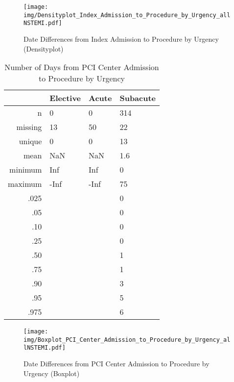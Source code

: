 \documentclass[presentation,xcolor=pdftex,dvipsnames,table,11pt]{beamer}
\begin{document}
\begin{tiny}
\begin{frame}
\begin{figure}
  \centering
  \caption{Date Differences from Index Admission to Procedure by Urgency (Densityplot)}
  \label{Density: Date Differences from Index Admission to Procedure by Urgency}
\texttt{[image: img/Densityplot\_Index\_Admission\_to\_Procedure\_by\_Urgency\_allNSTEMI.pdf]}\end{figure}
\end{frame}





\begin{table}[ht]
\centering
\begin{tabular}{rlll}
  \toprule
 & Elective & Acute & Subacute \\ 
  \midrule
n & 0 & 0 & 314 \\ 
  missing & 13 & 50 & 22 \\ 
  unique & 0 & 0 & 13 \\ 
  mean & NaN & NaN & 1.6 \\ 
  minimum & Inf & Inf & 0 \\ 
  maximum & -Inf & -Inf & 75 \\ 
  .025 &  &  & 0 \\ 
  .05 &  &  & 0 \\ 
  .10 &  &  & 0 \\ 
  .25 &  &  & 0 \\ 
  .50 &  &  & 1 \\ 
  .75 &  &  & 1 \\ 
  .90 &  &  & 3 \\ 
  .95 &  &  & 5 \\ 
  .975 &  &  & 6 \\ 
   \bottomrule
\end{tabular}
\caption{Number of Days from PCI Center Admission to Procedure by Urgency} 
\end{table}
\begin{frame}
\begin{figure}
  \centering
  \caption{Date Differences from PCI Center Admission to Procedure by Urgency (Boxplot)}
  \label{Boxplot: Date Differences from PCI Center Admission to Procedure by Urgency}
\texttt{[image: img/Boxplot\_PCI\_Center\_Admission\_to\_Procedure\_by\_Urgency\_allNSTEMI.pdf]}\end{figure}
\end{frame}



\end{tiny}
\end{document}
